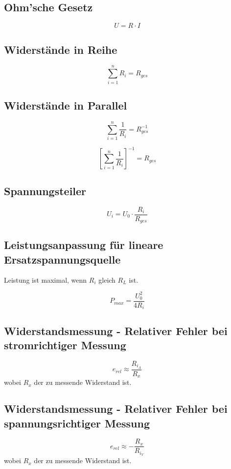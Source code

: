 \subsection*{Ohm'sche Gesetz}

\[
U = R \cdot I
\]

\subsection*{Widerstände in Reihe}

\[
\sum_{i=1}^{n} R_i = R_{ges}
\]

\subsection*{Widerstände in Parallel}

\[
\sum_{i=1}^{n} \frac{1}{R_i} = R_{ges}^{-1}
\]

\[
\left[ \sum_{i=1}^{n} \frac{1}{R_i} \right]^{-1} = R_{ges}
\]

\subsection*{Spannungsteiler}

\[
U_i = U_0 \cdot \frac{R_i}{R_{ges}}
\]

\subsection*{Leistungsanpassung für lineare Ersatzspannungsquelle}
Leistung ist maximal, wenn \(R_i\) gleich \(R_L\) ist.

\[
P_{max} = \frac{U_0^{2}}{4R_i}
\]

\subsection*{Widerstandsmessung - Relativer Fehler bei stromrichtiger Messung}

\[
e_{rel} \approx \frac{R_{i_A}}{R_x}
\]
wobei \(R_x\) der zu messende Widerstand ist.

\subsection*{Widerstandsmessung - Relativer Fehler bei spannungsrichtiger Messung}

\[
e_{rel} \approx -\frac{R_x}{R_{i_V}}
\]
wobei \(R_x\) der zu messende Widerstand ist.




\renewcommand{\chaptername}{Versuch}
\newpage
{}
